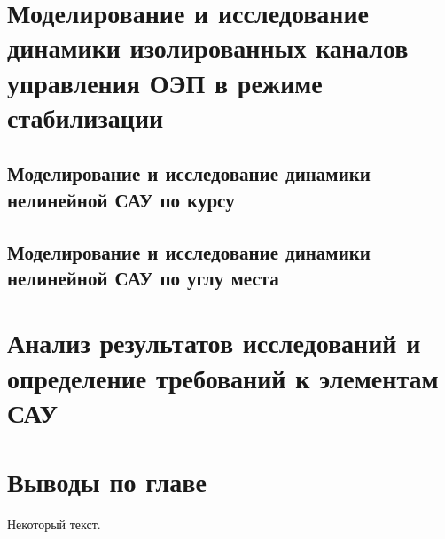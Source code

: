 \section{Моделирование и исследование динамики изолированных каналов управления ОЭП в режиме стабилизации} \label{ch:ch4/sect6}


\subsection{Моделирование и исследование динамики нелинейной САУ по курсу} \label{subsec:ch4/sect6/sub1}


\subsection{Моделирование и исследование динамики нелинейной САУ по углу места} \label{subsec:ch4/sect6/sub2}


\section{Анализ результатов исследований и определение требований к элементам САУ} \label{ch:ch4/sect7}


\section{Выводы по главе} \label{ch:ch4/sect8}



Некоторый текст.

\clearpage